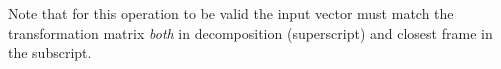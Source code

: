 %
Note that for this operation to be valid the input vector must match the transformation matrix \emph{both} in decomposition (superscript) and closest frame in the subscript.



% 
%
%




